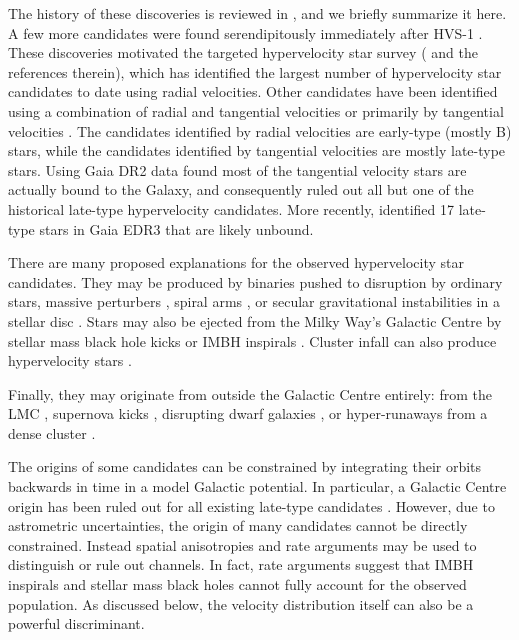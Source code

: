 \documentclass[fleqn,usenatbib]{mnras}
\begin{document}
The history of these discoveries is reviewed in \citet{warren_brown2015}, and we briefly summarize it here.
A few more candidates were found serendipitously immediately after HVS-1 \citep{hirsch+2005, edelmann+2005}. 
These discoveries motivated the targeted hypervelocity star survey (\citealt{warren_brown+2014} and the references therein), which has identified the largest number of hypervelocity star candidates to date using radial velocities. Other candidates have been identified using a combination of radial and tangential velocities \citep{heber+2008, zheng+2014} or primarily by tangential velocities  \citep{tillich+2009,irrgang+2010,tillich+2011,li_hvs+2012, pereira+2012, pereira+2013,palladino+2014, zhong_hvs+2014}. The candidates identified by radial velocities are early-type (mostly B) stars, while the candidates identified by tangential velocities are mostly late-type stars. Using Gaia DR2 data \citet{boubert+2018} found most of the tangential velocity stars are actually bound to the Galaxy, and consequently ruled out all but one of the historical late-type hypervelocity candidates. More recently, \citet{marchetti2021} identified 17 late-type stars in Gaia EDR3 that are likely unbound. 


There are many proposed explanations for the observed hypervelocity star candidates. They may be produced by binaries pushed to disruption by ordinary stars, massive perturbers \citep{perets+2007}, spiral arms \citep{hamers&perets2017}, or secular gravitational instabilities in a stellar disc \citep{madigan+2009}. Stars may also be ejected from the Milky Way's Galactic Centre  by stellar mass black hole kicks \citep{yu&tremaine2003,oleary&loeb2008} or IMBH inspirals \citep{yu&tremaine2003,levin2007}.
Cluster infall can also produce hypervelocity stars \citep{fragione+2017}.


Finally, they may originate from outside the Galactic Centre entirely: from the LMC \citep{edelmann+2005,gualandris&portegies-zwart2007,boubert+2017}, supernova kicks \citep{blaauw1961}, disrupting dwarf galaxies \citep{abadi+2009}, or hyper-runaways from a dense cluster \citep{poveda+1967,perets&subr2012}.

The origins of some candidates can be constrained by integrating their orbits backwards in time in a model Galactic potential. In particular, a Galactic Centre origin has been ruled out for all existing late-type candidates \citep{marchetti2021}. However, due to astrometric uncertainties, the origin of many candidates cannot be directly constrained. Instead spatial anisotropies \citep{warren_brown+2009} and rate arguments \citep{perets2009,perets&gualandris2010} may be used to distinguish or rule out channels. In fact, rate arguments suggest that IMBH inspirals and stellar mass black holes cannot fully account for the observed population. As discussed below, the velocity distribution itself can also be a powerful discriminant.
\end{document}
